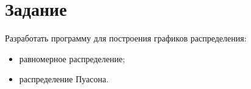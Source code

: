 \chapter{Задание}

Разработать программу для построения графиков распределения:

\begin{itemize}
    \item равномерное распределение;
    \item распределение Пуасона.
\end{itemize}